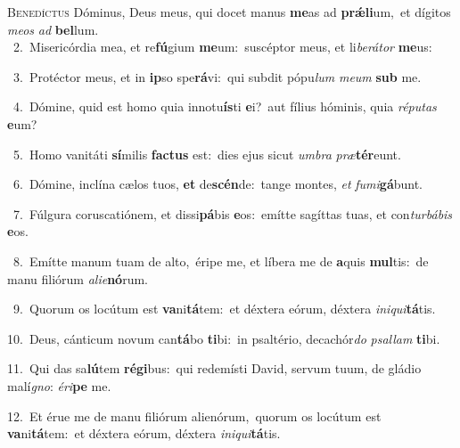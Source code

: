 \lettrine{\initial\textcolor{\initialcolor}{B}}{enedíctus} Dóminus, Deus meus, qui docet manus \textbf{me}\-as ad \textbf{prǽ}\-\textbf{li}um,~\star et dígitos \textit{me}\-\textit{os} \textit{ad} \textbf{bel}\-lum.\\
{\numbfont\textcolor{\numbcolor}{~2.}}~Misericórdia mea, et re\-\textbf{fú}\-gium \textbf{me}\-um:~\star suscéptor meus, et li\-\textit{be}\-\textit{rá}\textit{tor} \textbf{me}\-us:\par
{\numbfont\textcolor{\numbcolor}{~3.}}~Protéctor meus, et in \textbf{ip}\-so spe\-\textbf{rá}\-vi:~\star qui subdit pópu\textit{lum} \textit{me}\-\textit{um} \textbf{sub} me.\par
{\numbfont\textcolor{\numbcolor}{~4.}}~Dómine, quid est homo quia innotu\-\textbf{ís}\-ti \textbf{e}\-i?~\star aut fílius hóminis, quia \textit{ré}\-\textit{pu}\textit{tas} \textbf{e}\-um?\par
{\numbfont\textcolor{\numbcolor}{~5.}}~Homo vanitáti \textbf{sí}\-milis \textbf{fac}\-\textbf{tus} est:~\star dies ejus sicut \textit{um}\-\textit{bra} \textit{præ}\-\textbf{tér}eunt.\par
{\numbfont\textcolor{\numbcolor}{~6.}}~Dómine, inclína cælos tuos, \textbf{et} de\-\textbf{scén}\-de:~\star tange montes, \textit{et} \textit{fu}\-\textit{mi}\textbf{gá}bunt.\par
{\numbfont\textcolor{\numbcolor}{~7.}}~Fúlgura coruscatiónem, et dissi\-\textbf{pá}\-bis \textbf{e}\-os:~\star emítte sagíttas tuas, et con\-\textit{tur}\-\textit{bá}\textit{bis} \textbf{e}\-os.\par
{\numbfont\textcolor{\numbcolor}{~8.}}~Emítte manum tuam de alto,~\dagger éripe me, et líbera me de \textbf{a}\-quis \textbf{mul}\-tis:~\star de manu filiórum \textit{a}\-\textit{li}\textit{e}\textbf{nó}rum.\par
{\numbfont\textcolor{\numbcolor}{~9.}}~Quorum os locútum est \textbf{va}\-ni\-\textbf{tá}\-tem:~\star et déxtera eórum, déxtera \textit{in}\-\textit{i}\textit{qui}\textbf{tá}tis.\par
{\numbfont\textcolor{\numbcolor}{10.}}~Deus, cánticum novum can\-\textbf{tá}\-bo \textbf{ti}\-bi:~\star in psaltério, decachór\textit{do} \textit{psal}\-\textit{lam} \textbf{ti}\-bi.\par
{\numbfont\textcolor{\numbcolor}{11.}}~Qui das sa\-\textbf{lú}\-tem \textbf{ré}\-\textbf{gi}bus:~\star qui redemísti David, servum tuum, de gládio malí\-\textit{gno}\-: \textit{é}\-\textit{ri}\textbf{pe} me.\par
{\numbfont\textcolor{\numbcolor}{12.}}~Et érue me de manu filiórum alienórum,~\dagger quorum os locútum est \textbf{va}\-ni\-\textbf{tá}\-tem:~\star et déxtera eórum, déxtera \textit{in}\-\textit{i}\textit{qui}\textbf{tá}tis.\par
